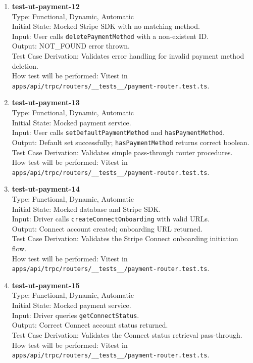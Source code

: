 \documentclass[12pt, titlepage]{article}
\begin{document}
\begin{enumerate}
\item \textbf{test-ut-payment-12}\\
Type: Functional, Dynamic, Automatic\\
Initial State: Mocked Stripe SDK with no matching method.\\
Input: User calls \texttt{deletePaymentMethod} with a non-existent ID.\\
Output: NOT\_FOUND error thrown.\\
Test Case Derivation: Validates error handling for invalid payment method deletion.\\
How test will be performed: Vitest in \texttt{apps/api/trpc/routers/\_\_tests\_\_/payment-router.test.ts}.\\

\item \textbf{test-ut-payment-13}\\
Type: Functional, Dynamic, Automatic\\
Initial State: Mocked payment service.\\
Input: User calls \texttt{setDefaultPaymentMethod} and \texttt{hasPaymentMethod}.\\
Output: Default set successfully; \texttt{hasPaymentMethod} returns correct boolean.\\
Test Case Derivation: Validates simple pass-through router procedures.\\
How test will be performed: Vitest in \texttt{apps/api/trpc/routers/\_\_tests\_\_/payment-router.test.ts}.\\

\item \textbf{test-ut-payment-14}\\
Type: Functional, Dynamic, Automatic\\
Initial State: Mocked database and Stripe SDK.\\
Input: Driver calls \texttt{createConnectOnboarding} with valid URLs.\\
Output: Connect account created; onboarding URL returned.\\
Test Case Derivation: Validates the Stripe Connect onboarding initiation flow.\\
How test will be performed: Vitest in \texttt{apps/api/trpc/routers/\_\_tests\_\_/payment-router.test.ts}.\\

\item \textbf{test-ut-payment-15}\\
Type: Functional, Dynamic, Automatic\\
Initial State: Mocked payment service.\\
Input: Driver queries \texttt{getConnectStatus}.\\
Output: Correct Connect account status returned.\\
Test Case Derivation: Validates the Connect status retrieval pass-through.\\
How test will be performed: Vitest in \texttt{apps/api/trpc/routers/\_\_tests\_\_/payment-router.test.ts}.\\


\end{enumerate}
\end{document}
